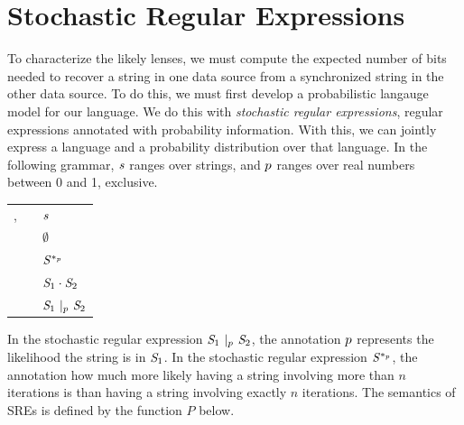 \documentclass[acmsmall,screen,anonymous]{acmart}
\begin{document}

\section{Stochastic Regular Expressions}
\label{sec:sre}
To characterize the likely lenses, we must compute the expected number of bits
needed to recover a string in one data source from a synchronized string in the
other data source. To do this, we must first develop a probabilistic langauge
model for our language. We do this with \emph{stochastic regular expressions},
regular expressions annotated with probability information. With this, we can
jointly express a language and a probability distribution over that language. In
the following grammar, $\String$ ranges over strings, and $\Probability$ ranges
over real numbers between 0 and 1, exclusive.

\begin{center}
  \begin{tabular}{rcl}
    \Regex{},\RegexAlt{}
    & \GEq{} & $\String$ \\
    & \GBar{} & $\emptyset$ \\
    & \GBar{} & $\PRegexStar{\Regex}{p}$ \\
    & \GBar{} & $\RegexConcat{\Regex_1}{\Regex_2}$ \\
    & \GBar{} & $\PRegexOr{\Regex_1}{\Regex_2}{p}$
  \end{tabular}
\end{center}

In the stochastic regular expression
$\PRegexOr{\Regex_1}{\Regex_2}{\Probability}$, the annotation $\Probability$
represents the likelihood the string is in $\Regex_1$. In the stochastic regular
expression $\PRegexStar{\Regex}{\Probability}$, the annotation \Probability how
much more likely having a string involving more than $n$ iterations is than
having a string involving exactly $n$ iterations. The semantics of SREs is
defined by the function $P$ below.
\end{document}
